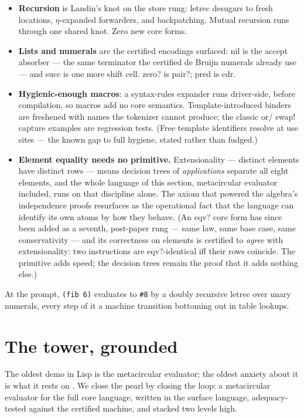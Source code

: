 \documentclass[acmsmall,screen,review]{acmart}
\begin{document}
\begin{itemize}
\item \textbf{Recursion} is Landin's knot on the store rung:
  \textsf{letrec} desugars to fresh locations, $\eta$-expanded
  for\-warders, and backpatching. Mutual recursion runs through one
  shared knot. Zero new core forms.
\item \textbf{Lists and numerals} are the certified encodings
  surfaced: nil is the accept absorber --- the same terminator the
  certified de Bruijn numerals already use --- and \textsf{succ} is
  one more shift cell. \textsf{zero?} is \textsf{pair?};
  \textsf{pred} is \textsf{cdr}.
\item \textbf{Hygienic-enough macros}: a \textsf{syntax-rules}
  expander runs driver-side, before compilation, so macros add no
  core semantics. Template-introduced binders are freshened with
  names the tokenizer cannot produce; the classic \textsf{or}/%
  \textsf{swap!} capture examples are regression tests. (Free
  template identifiers resolve at use sites --- the known gap to full
  hygiene, stated rather than fudged.)
\item \textbf{Element equality needs no primitive.} Extensionality
  --- distinct elements have distinct rows --- means decision trees
  of \emph{applications} separate all eight elements, and the whole
  language of this section, metacircular evaluator included, runs on
  that discipline alone. The axiom that powered the algebra's
  independence proofs resurfaces as the operational fact that the
  language can identify its own atoms by how they behave. (An
  \textsf{eqv?} core form has since been added as a seventh,
  post-paper rung --- same law, same base case, same conservativity
  --- and its correctness on elements is certified to \emph{agree}
  with extensionality: two instructions are \textsf{eqv?}-identical
  iff their rows coincide. The primitive adds speed; the decision
  trees remain the proof that it adds nothing else.)
\end{itemize}

At the prompt, \verb|(fib 6)| evaluates to \verb|#8| by a doubly
recursive \textsf{letrec} over unary numerals, every step of it a
machine transition bottoming out in table lookups.

\section{The tower, grounded}
\label{sec:tower}

The oldest demo in Lisp is the metacircular evaluator; the oldest
anxiety about it is what it rests on \cite{smith84,wand88}. We close
the pearl by closing the loop: a metacircular evaluator for the full
core language, written in the surface language, adequacy-tested
against the certified machine, and stacked two levels high.
\end{document}
